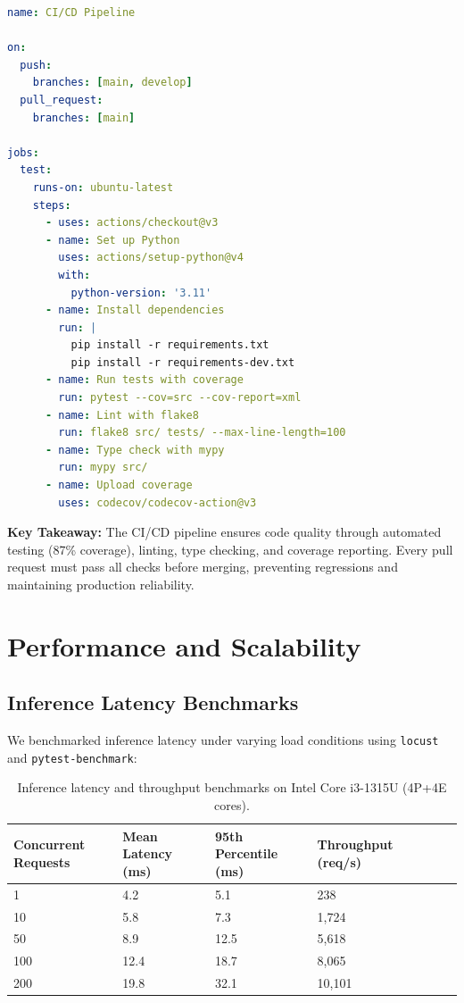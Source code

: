 \documentclass[12pt,a4paper]{article}
\renewcommand{\arraystretch}{1.5}
\newcommand{\goldrowcolors}{%
    \rowcolors{2}{bgCard}{bgDark}%
}
\newcommand{\tableheader}[1]{\textcolor{accentGold}{\textbf{#1}}}
\newcommand{\tablehdrrow}{\rowcolor{accentCard}}
\begin{document}
\begin{lstlisting}[language=yaml, caption={GitHub Actions CI/CD workflow}]
name: CI/CD Pipeline

on:
  push:
    branches: [main, develop]
  pull_request:
    branches: [main]

jobs:
  test:
    runs-on: ubuntu-latest
    steps:
      - uses: actions/checkout@v3
      - name: Set up Python
        uses: actions/setup-python@v4
        with:
          python-version: '3.11'
      - name: Install dependencies
        run: |
          pip install -r requirements.txt
          pip install -r requirements-dev.txt
      - name: Run tests with coverage
        run: pytest --cov=src --cov-report=xml
      - name: Lint with flake8
        run: flake8 src/ tests/ --max-line-length=100
      - name: Type check with mypy
        run: mypy src/
      - name: Upload coverage
        uses: codecov/codecov-action@v3
\end{lstlisting}

\begin{tipbox}
\textbf{Key Takeaway:} The CI/CD pipeline ensures code quality through automated testing (87\% coverage), linting, type checking, and coverage reporting. Every pull request must pass all checks before merging, preventing regressions and maintaining production reliability.
\end{tipbox}

\newpage
\section{Performance and Scalability}
\label{sec:performance}

\subsection{Inference Latency Benchmarks}
\label{subsec:latency}

We benchmarked inference latency under varying load conditions using \texttt{locust} and \texttt{pytest-benchmark}:

\begin{table}[H]
\centering
\goldrowcolors
\renewcommand{\arraystretch}{1.5}
\begin{tabular}{@{}L{4cm} V C{3cm} V C{3cm} V C{3cm}@{}}
\toprule
\tablehdrrow
\tableheader{Concurrent Requests} & \tableheader{Mean Latency (ms)} & \tableheader{95th Percentile (ms)} & \tableheader{Throughput (req/s)} \\
 & 4.2 & 5.1 & 238 \\
10 & 5.8 & 7.3 & 1,724 \\
50 & 8.9 & 12.5 & 5,618 \\
100 & 12.4 & 18.7 & 8,065 \\
200 & 19.8 & 32.1 & 10,101 \\
\bottomrule
\end{tabular}
\caption{Inference latency and throughput benchmarks on Intel Core i3-1315U (4P+4E cores).}
\label{tab:latency}
\end{table}
\end{document}
